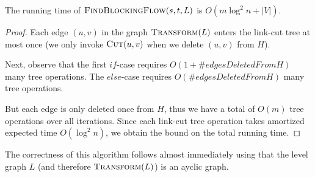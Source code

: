 \begin{claim}
The running time of $\textsc{FindBlockingFlow}(s, t, L)$ is $O(m \log^2 n + |V|)$.
\end{claim}
\begin{proof}
Each edge $(u,v)$ in the graph $\textsc{Transform}(L)$ enters the link-cut tree at most once (we only invoke $\textsc{Cut}(u,v)$ when we delete $(u,v)$ from $H$). 

Next, observe that the first $if$-case requires $O(1 + \#edgesDeletedFromH)$ many tree operations. The $else$-case requires $O(\#edgesDeletedFromH)$ many tree operations. 

But each edge is only deleted once from $H$, thus we have a total of $O(m)$ tree operations over all iterations. Since each link-cut tree operation takes amortized expected time $O(\log^2 n)$, we obtain the bound on the total running time. 
\end{proof}

The correctness of this algorithm follows almost immediately using that the level graph $L$ (and therefore $\textsc{Transform}(L)$) is an ayclic graph.

